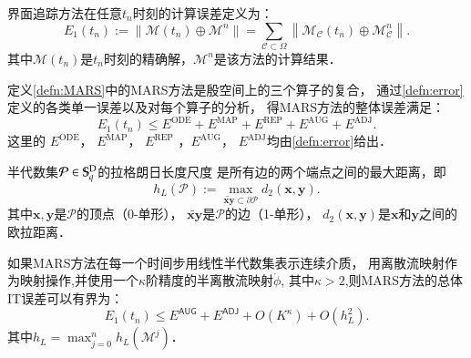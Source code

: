 界面追踪方法在任意$t_n$时刻的计算误差定义为：
\begin{equation}
\label{eq:geomError}
E_1(t_n) := \|\mathcal{M}(t_n) \oplus
\mathcal{M}^{n}\| = \sum_{{\mathcal C}\subset \Omega}
\left\|\mathcal{M}_{\mathcal C}(t_n) \oplus
\mathcal{M}_{\mathcal C}^{n}\right\|.
\end{equation}
其中$\mathcal{M}(t_n)$是$t_n$时刻的精确解，$\mathcal{M}^n$是该方法的计算结果．
\begin{thm}
定义\ref{defn:MARS}中的MARS方法是殷空间上的三个算子的复合，
通过\eqref{defn:error}定义的各类单一误差以及对每个算子的分析，
得MARS方法的整体误差满足\cite{zhang16:_mars}：
 \begin{equation}
\label{eq:E1parts}
E_1(t_n)  \le E^{\mathrm{ODE}} + E^{\mathrm{MAP}}
+ E^{\mathrm{REP}} + E^{\mathrm{AUG}} + E^{\mathrm{ADJ}}.
\end{equation}
这里的 $E^{\mathrm{ODE}}$，  $E^{\mathrm{MAP}}$，
$E^{\mathrm{REP}}$ ，$E^{\mathrm{AUG}}$， $E^{\mathrm{ADJ}}$均由\eqref{defn:error}给出． 
\end{thm}

\begin{defn}
	半代数集$\mathcal{P}\in\mathbb{S}_q^{\textup{D}}$的拉格朗日长度尺度
	是所有边的两个端点之间的最大距离，即
	\begin{equation}
	\label{defn:LagrangeLength}
	h_L(\mathcal{P}):= \max_{\widetilde{\mathbf{xy}}\subset\partial\mathcal{P}}d_2(\mathbf{x},\mathbf{y}).
	\end{equation}
	其中$\mathbf{x,y}$是$\mathcal{P}$的顶点（0-单形），
	$\widetilde{\mathbf{xy}}$是$\mathcal{P}$的边（1-单形），
	$d_2(\mathbf{x,y})$是$\mathbf{x}$和$\mathbf{y}$之间的欧拉距离．
\end{defn}
\begin{cor}\label{cor:errorbound}
	如果MARS方法在每一个时间步用线性半代数集表示连续介质，
	用离散流映射作为映射操作,并使用一个$\kappa$阶精度的半离散流映射$\mathring{ \phi}$,
	其中$\kappa>2$,则MARS方法的总体IT误差可以有界为：
	\begin{equation}
	E_1(t_n)\leq E^{\textsf{AUG}}+E^{\textsf{ADJ}}+O(K^{\kappa})+O(h_L^2).
	\end{equation}
	其中$h_L=\max_{j=0}^nh_L(\mathcal{M}^j)$．
\end{cor}


